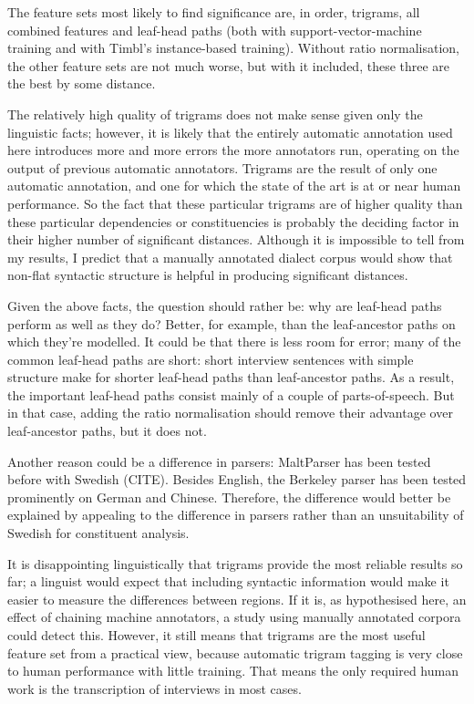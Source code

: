 The feature sets most likely to find significance are, in order,
trigrams, all combined features and leaf-head paths (both with
support-vector-machine training and with Timbl's instance-based
training). Without ratio normalisation, the other feature sets are not
much worse, but with it included, these three are the best by some
distance.

The relatively high quality of trigrams does not make sense given only
the linguistic facts; however, it is likely that the entirely
automatic annotation used here introduces more and more errors the
more annotators run, operating on the output of previous automatic
annotators. Trigrams are the result of only one
automatic annotation, and one for which the state of the art is at or
near human performance. So the fact that these particular trigrams are
of higher quality than these particular dependencies or constituencies
is probably the deciding factor in their higher number of significant
distances. Although it is impossible to tell from my results, I
predict that a manually annotated dialect corpus would show that
non-flat syntactic structure is helpful in producing significant
distances.

Given the above facts, the question should rather be: why are
leaf-head paths perform as well as they do? Better, for example, than
the leaf-ancestor paths on which they're modelled. It could be that
there is less room for error; many of the common leaf-head paths are
short: short interview sentences with simple structure make for
shorter leaf-head paths than leaf-ancestor paths. As a result, the
important leaf-head paths consist mainly of a couple of
parts-of-speech. But in that case, adding the ratio normalisation
should remove their advantage over leaf-ancestor paths, but it does
not.

Another reason could be a difference in parsers: MaltParser has been
tested before with Swedish (CITE). Besides English, the Berkeley
parser has been tested prominently on German and Chinese. Therefore,
the difference would better be explained by appealing to the
difference in parsers rather than an unsuitability of Swedish for
constituent analysis.

It is disappointing linguistically that trigrams provide the most
reliable results so far; a linguist would expect that including
syntactic information would make it easier to measure the differences
between regions. If it is, as hypothesised here, an effect of chaining
machine annotators, a study using manually annotated corpora could
detect this. However, it still means that trigrams are the most useful
feature set from a practical view, because automatic trigram tagging
is very close to human performance with little training. That means
the only required human work is the transcription of interviews in
most cases.

